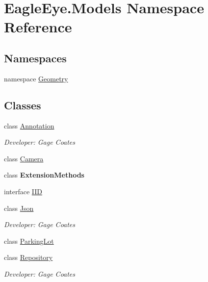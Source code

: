 \hypertarget{namespace_eagle_eye_1_1_models}{}\section{Eagle\+Eye.\+Models Namespace Reference}
\label{namespace_eagle_eye_1_1_models}
\subsection*{Namespaces}
\begin{DoxyCompactItemize}
\item 
namespace \mbox{\hyperlink{namespace_eagle_eye_1_1_models_1_1_geometry}{Geometry}}
\end{DoxyCompactItemize}
\subsection*{Classes}
\begin{DoxyCompactItemize}
\item 
class \mbox{\hyperlink{class_eagle_eye_1_1_models_1_1_annotation}{Annotation}}
\begin{DoxyCompactList}\small\item\em Developer\+: Gage Coates \end{DoxyCompactList}\item 
class \mbox{\hyperlink{class_eagle_eye_1_1_models_1_1_camera}{Camera}}
\item 
class {\bfseries Extension\+Methods}
\item 
interface \mbox{\hyperlink{interface_eagle_eye_1_1_models_1_1_i_i_d}{I\+ID}}
\item 
class \mbox{\hyperlink{class_eagle_eye_1_1_models_1_1_json}{Json}}
\begin{DoxyCompactList}\small\item\em Developer\+: Gage Coates \end{DoxyCompactList}\item 
class \mbox{\hyperlink{class_eagle_eye_1_1_models_1_1_parking_lot}{Parking\+Lot}}
\item 
class \mbox{\hyperlink{class_eagle_eye_1_1_models_1_1_repository}{Repository}}
\begin{DoxyCompactList}\small\item\em Developer\+: Gage Coates \end{DoxyCompactList}\end{DoxyCompactItemize}
